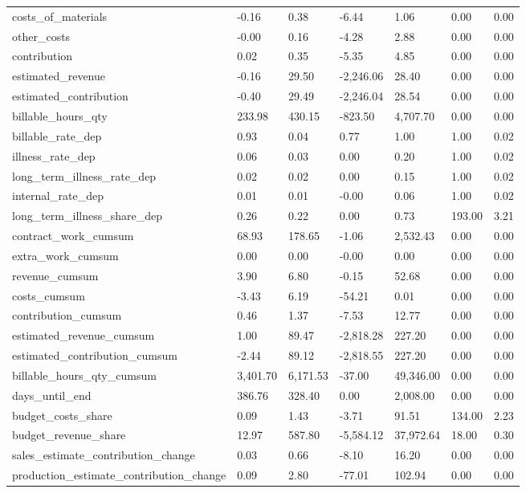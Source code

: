 \begin{landscape}
\begin{longtable}[h!]{lllllll}
costs_of_materials & -0.16 & 0.38 & -6.44 & 1.06 & 0.00 & 0.00 \\
other_costs & -0.00 & 0.16 & -4.28 & 2.88 & 0.00 & 0.00 \\
contribution & 0.02 & 0.35 & -5.35 & 4.85 & 0.00 & 0.00 \\
estimated_revenue & -0.16 & 29.50 & -2,246.06 & 28.40 & 0.00 & 0.00 \\
estimated_contribution & -0.40 & 29.49 & -2,246.04 & 28.54 & 0.00 & 0.00 \\
billable_hours_qty & 233.98 & 430.15 & -823.50 & 4,707.70 & 0.00 & 0.00 \\
billable_rate_dep & 0.93 & 0.04 & 0.77 & 1.00 & 1.00 & 0.02 \\
illness_rate_dep & 0.06 & 0.03 & 0.00 & 0.20 & 1.00 & 0.02 \\
long_term_illness_rate_dep & 0.02 & 0.02 & 0.00 & 0.15 & 1.00 & 0.02 \\
internal_rate_dep & 0.01 & 0.01 & -0.00 & 0.06 & 1.00 & 0.02 \\
long_term_illness_share_dep & 0.26 & 0.22 & 0.00 & 0.73 & 193.00 & 3.21 \\
contract_work_cumsum & 68.93 & 178.65 & -1.06 & 2,532.43 & 0.00 & 0.00 \\
extra_work_cumsum & 0.00 & 0.00 & -0.00 & 0.00 & 0.00 & 0.00 \\
revenue_cumsum & 3.90 & 6.80 & -0.15 & 52.68 & 0.00 & 0.00 \\
costs_cumsum & -3.43 & 6.19 & -54.21 & 0.01 & 0.00 & 0.00 \\
contribution_cumsum & 0.46 & 1.37 & -7.53 & 12.77 & 0.00 & 0.00 \\
estimated_revenue_cumsum & 1.00 & 89.47 & -2,818.28 & 227.20 & 0.00 & 0.00 \\
estimated_contribution_cumsum & -2.44 & 89.12 & -2,818.55 & 227.20 & 0.00 & 0.00 \\
billable_hours_qty_cumsum & 3,401.70 & 6,171.53 & -37.00 & 49,346.00 & 0.00 & 0.00 \\
days_until_end & 386.76 & 328.40 & 0.00 & 2,008.00 & 0.00 & 0.00 \\
budget_costs_share & 0.09 & 1.43 & -3.71 & 91.51 & 134.00 & 2.23 \\
budget_revenue_share & 12.97 & 587.80 & -5,584.12 & 37,972.64 & 18.00 & 0.30 \\
sales_estimate_contribution_change & 0.03 & 0.66 & -8.10 & 16.20 & 0.00 & 0.00 \\
production_estimate_contribution_change & 0.09 & 2.80 & -77.01 & 102.94 & 0.00 & 0.00 \\

\end{longtable}
\end{landscape}
